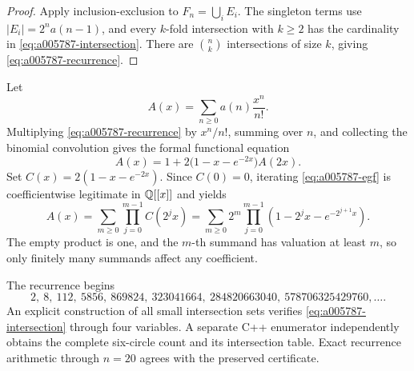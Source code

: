 \begin{proof}
Apply inclusion-exclusion to \(F_n=\bigcup_iE_i\).  The singleton terms use
\(|E_i|=2^na(n-1)\), and every \(k\)-fold intersection with \(k\ge2\) has the
cardinality in \cref{eq:a005787-intersection}.  There are \(\binom nk\)
intersections of size \(k\), giving \cref{eq:a005787-recurrence}.
\end{proof}

Let
\[
 A(x)=\sum_{n\ge0}a(n)\frac{x^n}{n!}.
\]
Multiplying \cref{eq:a005787-recurrence} by \(x^n/n!\), summing over \(n\),
and collecting the binomial convolution gives the formal functional equation
\begin{equation}
 \boxed{A(x)=1+2\bigl(1-x-e^{-2x}\bigr)A(2x).}
 \label{eq:a005787-egf}
\end{equation}
Set \(C(x)=2(1-x-e^{-2x})\).  Since \(C(0)=0\), iterating
\cref{eq:a005787-egf} is coefficientwise legitimate in \(\mathbb{Q}[[x]]\) and yields
\begin{equation}
 \boxed{
 A(x)=\sum_{m\ge0}\prod_{j=0}^{m-1}C(2^jx)
 =\sum_{m\ge0}2^m\prod_{j=0}^{m-1}
 \left(1-2^jx-e^{-2^{j+1}x}\right).}
 \label{eq:a005787-product}
\end{equation}
The empty product is one, and the \(m\)-th summand has valuation at least
\(m\), so only finitely many summands affect any coefficient.

The recurrence begins
\[
 2,\ 8,\ 112,\ 5856,\ 869824,\ 323041664,
 \ 284820663040,\ 578706325429760,\ldots.
\]
An explicit construction of all small intersection sets verifies
\cref{eq:a005787-intersection} through four variables.  A separate C++
enumerator independently obtains the complete six-circle count and its
intersection table.  Exact recurrence arithmetic through \(n=20\) agrees with
the preserved certificate.
